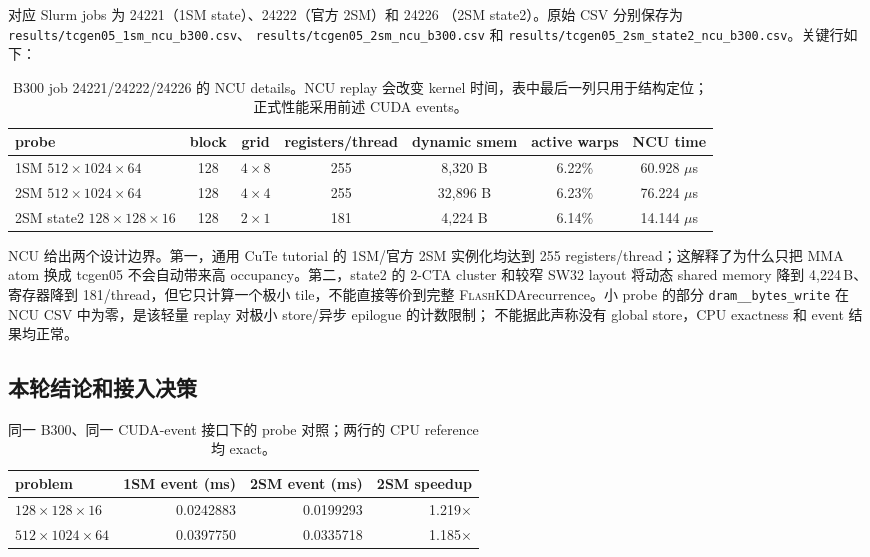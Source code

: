 \documentclass[11pt,a4paper,fontset=none]{ctexart}
\newcommand{\FlashKDA}{\textsc{FlashKDA}}
\newcommand{\code}[1]{\texttt{#1}}
\begin{document}
对应 Slurm jobs 为 24221（1SM state）、24222（官方 2SM）和 24226
（2SM state2）。原始 CSV 分别保存为
\code{results/tcgen05\_1sm\_ncu\_b300.csv}、
\code{results/tcgen05\_2sm\_ncu\_b300.csv} 和
\code{results/tcgen05\_2sm\_state2\_ncu\_b300.csv}。关键行如下：

\begin{table}[htbp]
\centering
\small
\begin{tabular}{l c c c c c c}
\toprule
probe & block & grid & registers/thread & dynamic smem & active warps & NCU time \\
\midrule
1SM \(512\times1024\times64\) & 128 & \(4\times8\) & 255 & 8,320 B & 6.22\% & 60.928 \(\mu\)s \\
2SM \(512\times1024\times64\) & 128 & \(4\times4\) & 255 & 32,896 B & 6.23\% & 76.224 \(\mu\)s \\
2SM state2 \(128\times128\times16\) & 128 & \(2\times1\) & 181 & 4,224 B & 6.14\% & 14.144 \(\mu\)s \\
\bottomrule
\end{tabular}
\caption{B300 job 24221/24222/24226 的 NCU details。NCU replay 会改变
kernel 时间，表中最后一列只用于结构定位；正式性能采用前述 CUDA events。}
\end{table}

NCU 给出两个设计边界。第一，通用 CuTe tutorial 的 1SM/官方 2SM
实例化均达到 255 registers/thread；这解释了为什么只把 MMA atom 换成
tcgen05 不会自动带来高 occupancy。第二，state2 的 \(2\)-CTA cluster
和较窄 SW32 layout 将动态 shared memory 降到 4,224\,B、寄存器降到
181/thread，但它只计算一个极小 tile，不能直接等价到完整
\FlashKDA recurrence。小 probe 的部分 \code{dram\_\_bytes\_write} 在
NCU CSV 中为零，是该轻量 replay 对极小 store/异步 epilogue 的计数限制；
不能据此声称没有 global store，CPU exactness 和 event 结果均正常。

\subsection{本轮结论和接入决策}

\begin{table}[htbp]
\centering
\small
\begin{tabular}{l r r r}
\toprule
problem & 1SM event (ms) & 2SM event (ms) & 2SM speedup \\
\midrule
\(128\times128\times16\) & 0.0242883 & 0.0199293 & 1.219\(\times\) \\
\(512\times1024\times64\) & 0.0397750 & 0.0335718 & 1.185\(\times\) \\
\bottomrule
\end{tabular}
\caption{同一 B300、同一 CUDA-event 接口下的 probe 对照；两行的
CPU reference 均 exact。}
\end{table}
\end{document}
